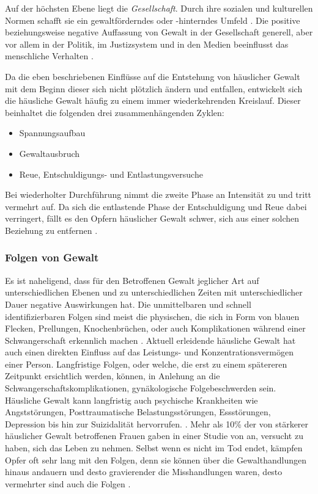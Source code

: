Auf der höchsten Ebene liegt die \textit{Gesellschaft}. Durch ihre sozialen und kulturellen Normen schafft sie ein gewaltförderndes oder -hinterndes Umfeld \parencite{Ursache_hG_2, Ursache_hG, Gewaltart}. Die positive beziehungsweise negative Auffassung von Gewalt in der Gesellschaft generell, aber vor allem in der Politik, im Justizsystem und in den Medien beeinflusst das menschliche Verhalten \parencite{Ursache_hG_2, Ursache_hG}.  

Da die eben beschriebenen Einflüsse auf die Entstehung von häuslicher Gewalt mit dem Beginn dieser sich nicht plötzlich ändern und entfallen, entwickelt sich die häusliche Gewalt häufig zu einem immer wiederkehrenden Kreislauf. Dieser beinhaltet die folgenden drei zusammenhängenden Zyklen: 

\begin{itemize}
    \item Spannungsaufbau
    \item Gewaltausbruch
    \item Reue, Entschuldigungs- und Entlastungsversuche
\end{itemize}

Bei wiederholter Durchführung nimmt die zweite Phase an Intensität zu und tritt vermehrt auf. Da sich die entlastende Phase der Entschuldigung und Reue dabei verringert, fällt es den Opfern häuslicher Gewalt schwer, sich aus einer solchen Beziehung zu entfernen \parencite{Def_haus_Gewalt}.


\subsubsection{Folgen von Gewalt}     \label{2.1.2.3}
Es ist naheligend, dass für den Betroffenen Gewalt jeglicher Art auf unterschiedlichen Ebenen und zu unterschiedlichen Zeiten mit unterschiedlicher Dauer negative Auswirkungen hat. Die unmittelbaren und schnell identifizierbaren Folgen sind meist die physischen, die sich in Form von blauen Flecken, Prellungen, Knochenbrüchen, oder auch Komplikationen während einer Schwangerschaft erkennlich machen \parencite{Def_Form_Folge_Gewalt, Gewaltart}. Aktuell erleidende häusliche Gewalt hat auch einen direkten Einfluss auf das Leistungs- und Konzentrationsvermögen einer Person. Langfristige Folgen, oder welche, die erst zu einem spätereren Zeitpunkt ersichtlich werden, können, in Anlehung an die Schwangerschaftskomplikationen, gynäkologische Folgebeschwerden sein. Häusliche Gewalt kann langfristig auch psychische Krankheiten wie Angststörungen, Posttraumatische Belastungsstörungen, Essstörungen, Depression bis hin zur Suizidalität hervorrufen. \parencite{Def_Form_Folge_Gewalt, Gewaltart}. Mehr als 10\% der von stärkerer häuslicher Gewalt betroffenen Frauen gaben in einer Studie von \textcite{psy_Folgen_hG} an, versucht zu haben, sich das Leben zu nehmen. Selbst wenn es nicht im Tod endet, kämpfen Opfer oft sehr lang mit den Folgen, denn sie können über die Gewalthandlungen hinaus andauern \parencite{Def_haus_Gewalt} und desto gravierender die Misshandlungen waren, desto vermehrter sind auch die Folgen \parencite{Gewaltart}.

